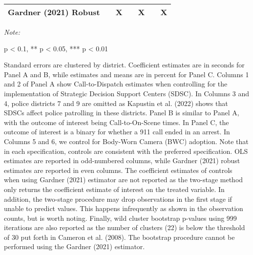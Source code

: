 \begin{table}[H]
\begin{threeparttable}
\begin{tabular}[t]{lcccccc}
\midrule
Gardner (2021) Robust &  & X &  & X &  & X\\
\bottomrule
\end{tabular}
\begin{tablenotes}
\item \textit{Note: } 
\item * p < 0.1, ** p < 0.05, *** p < 0.01
\item Standard errors are clustered by district.                      Coefficient estimates are in seconds for Panel A and B,                      while estimates and means are in percent for Panel C.                      Columns 1 and 2 of Panel A show                       Call-to-Dispatch estimates when controlling for the implementation                      of Strategic                      Decision Support Centers (SDSC). In Columns 3 and 4,                       police districts 7 and 9 are omitted as Kapustin et al. (2022) shows that SDSCs                       affect                      police patrolling in these districts. Panel B is similar to Panel A,                      with the outcome of interest being Call-to-On-Scene times. In Panel C, the outcome of                      interest is a binary for whether a 911 call ended in an arrest. In Columns 5 and 6,                      we control for Body-Worn Camera (BWC) adoption. Note that in each specification,                      controls are consistent with the preferred specification. OLS estimates are reported                      in odd-numbered columns, while Gardner (2021) robust estimates are reported in even columns.                      The coefficient estimates of controls when using Gardner (2021) estimator are not reported as the                       two-stage method only returns the coefficient estimate of interest on                      the treated variable. In addition, the two-stage procedure may drop observations                      in the first stage if unable to predict values. This happens infrequently as shown                      in the observation counts, but is worth noting. Finally,                      wild cluster bootstrap p-values using 999 iterations are also reported                  as the number of clusters (22) is below the threshold of 30 put forth in                  Cameron et al. (2008). The bootstrap procedure cannot be performed using the Gardner (2021) estimator.                                                           
\end{tablenotes}
\end{threeparttable}
\end{table}

